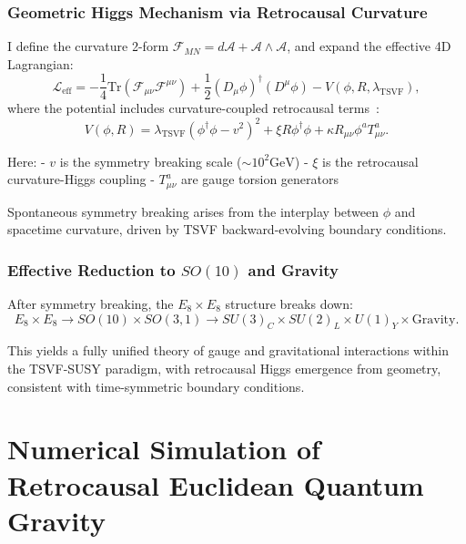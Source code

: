 \documentclass[twocolumn,superscriptaddress,floatfix]{revtex4-2}
\begin{document}
\subsubsection{Geometric Higgs Mechanism via Retrocausal Curvature}
\label{subsubsec:E8_higgs_mech}

I define the curvature 2-form \(\mathcal{F}_{MN} = d\mathcal{A} + \mathcal{A} \wedge \mathcal{A}\), and expand the effective 4D Lagrangian:
\begin{equation}
\mathcal{L}_{\text{eff}} = -\frac{1}{4} \text{Tr}(\mathcal{F}_{\mu\nu} \mathcal{F}^{\mu\nu}) + \frac{1}{2} (D_\mu \phi)^\dagger (D^\mu \phi) - V(\phi, R, \lambda_{\text{TSVF}}),
\label{eq:E8lagrangian}
\end{equation}
where the potential includes curvature-coupled retrocausal terms~\cite{Shaposhnikov2009, Rubakov2001}:
\begin{equation}
V(\phi, R) = \lambda_{\text{TSVF}} (\phi^\dagger \phi - v^2)^2 + \xi R \phi^\dagger \phi + \kappa R_{\mu\nu} \phi^a T^a_{\mu\nu}.
\label{eq:curvatureHiggs}
\end{equation}

Here:
- \(v\) is the symmetry breaking scale (\(\sim 10^2 \text{GeV}\))
- \(\xi\) is the retrocausal curvature-Higgs coupling
- \(T^a_{\mu\nu}\) are gauge torsion generators

Spontaneous symmetry breaking arises from the interplay between \(\phi\) and spacetime curvature, driven by TSVF backward-evolving boundary conditions.

\subsubsection{\texorpdfstring{Effective Reduction to \(SO(10)\)}{Effective Reduction to SO(10)} and Gravity}
\label{subsubsec:E8_breaking}

After symmetry breaking, the \(E_8 \times E_8\) structure breaks down:
\begin{equation}
E_8 \times E_8 \longrightarrow SO(10) \times SO(3,1) \longrightarrow SU(3)_C \times SU(2)_L \times U(1)_Y \times \text{Gravity}.
\label{eq:E8breaking}
\end{equation}

This yields a fully unified theory of gauge and gravitational interactions within the TSVF-SUSY paradigm, with retrocausal Higgs emergence from geometry, consistent with time-symmetric boundary conditions.

\section{Numerical Simulation of Retrocausal Euclidean Quantum Gravity}
\label{sec:retrocausal_simulations}
\end{document}

